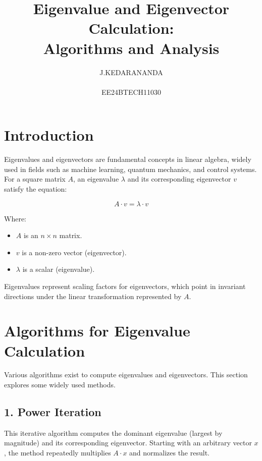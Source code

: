 \documentclass[12pt]{article}
\title{\textbf{\Huge \textcolor{headercolor}{Eigenvalue and Eigenvector Calculation: \\ Algorithms and Analysis}}}
\author{J.KEDARANANDA\\\\EE24BTECH11030}
\begin{document}
\maketitle

\section*{\textcolor{headercolor}{Introduction}}
\tcolorbox[colback=tableheadercolor!10, colframe=tablebordercolor, sharp corners=all, title=\textbf{Overview}]
Eigenvalues and eigenvectors are fundamental concepts in linear algebra, widely used in fields such as machine learning, quantum mechanics, and control systems. For a square matrix \( A \), an eigenvalue \( \lambda \) and its corresponding eigenvector \( v \) satisfy the equation:
\endtcolorbox

\begin{equation}
    A \cdot v = \lambda \cdot v
\end{equation}

Where:
\begin{itemize}
    \item \( A \) is an \( n \times n \) matrix.
    \item \( v \) is a non-zero vector (eigenvector).
    \item \( \lambda \) is a scalar (eigenvalue).
\end{itemize}

Eigenvalues represent scaling factors for eigenvectors, which point in invariant directions under the linear transformation represented by \( A \).

\section*{\textcolor{headercolor}{Algorithms for Eigenvalue Calculation}}
Various algorithms exist to compute eigenvalues and eigenvectors. This section explores some widely used methods.

\subsection*{\textcolor{subheadercolor}{1. Power Iteration}}
\tcolorbox[colback=tableheadercolor!10, colframe=tablebordercolor, sharp corners=all, title=\textbf{Method}]
This iterative algorithm computes the dominant eigenvalue (largest by magnitude) and its corresponding eigenvector. Starting with an arbitrary vector \( x \), the method repeatedly multiplies \( A \cdot x \) and normalizes the result.
\endtcolorbox
\end{document}
